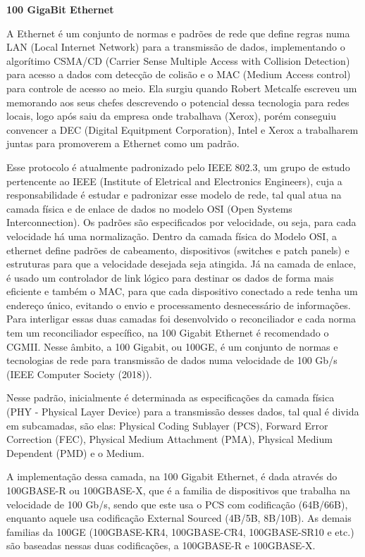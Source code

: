 \documentclass[a4paper,12pt]{article}
\begin{document}
\begin{center}
\textbf{{\LARGE 100 GigaBit Ethernet}} \\ \vspace{0.5cm}
\end{center}

A Ethernet é um conjunto de normas e padrões de rede que define regras numa LAN (Local Internet Network) para a transmissão de dados, implementando o algorítimo CSMA/CD (Carrier Sense Multiple Access with Collision Detection) para acesso a dados com detecção de colisão e o MAC (Medium Access control) para controle de acesso ao meio. Ela surgiu quando Robert Metcalfe escreveu um memorando aos seus chefes descrevendo o potencial dessa tecnologia para redes locais, logo após saiu da empresa onde trabalhava (Xerox), porém conseguiu convencer a DEC (Digital Equitpment Corporation), Intel e Xerox a trabalharem juntas para promoverem a Ethernet como um padrão.

Esse protocolo é atualmente padronizado pelo IEEE 802.3, um grupo de estudo pertencente ao IEEE (Institute of Eletrical and Electronics Engineers), cuja a responsabilidade é estudar e padronizar esse modelo de rede, tal qual atua na camada física e de enlace de dados no modelo OSI (Open Systems Interconnection). Os padrões são especificados por velocidade, ou seja, para cada velocidade há uma normalização.
Dentro da camada física do Modelo OSI, a ethernet define padrões de cabeamento, dispositivos (switches e patch panels) e estruturas para que a velocidade desejada seja atingida.
Já na camada de enlace, é usado um controlador de link lógico para destinar os dados de forma mais eficiente e também o MAC, para que cada dispositivo conectado a rede tenha um endereço único, evitando o envio e processamento desnecessário de informações.
Para interligar essas duas camadas foi desenvolvido o reconciliador e cada norma tem um reconciliador específico, na 100 Gigabit Ethernet é recomendado o CGMII.
Nesse âmbito, a 100 Gigabit, ou 100GE, é um conjunto de normas e tecnologias de rede para transmissão de dados numa velocidade de 100 Gb/s (IEEE Computer Society (2018)).


Nesse padrão, inicialmente é determinada as especificações da camada física (PHY - Physical Layer Device) para a transmissão desses dados, tal qual é divida em subcamadas, são elas: Physical Coding Sublayer (PCS), Forward Error Correction (FEC), Physical Medium Attachment (PMA), Physical Medium Dependent (PMD) e o Medium.

A implementação dessa camada, na 100 Gigabit Ethernet, é dada através do 100GBASE-R ou 100GBASE-X, que é a familia de dispositivos que trabalha na velocidade de 100 Gb/s, sendo que este usa o PCS com codificação (64B/66B), enquanto aquele usa codificação External Sourced (4B/5B, 8B/10B). As demais familias da 100GE (100GBASE-KR4, 100GBASE-CR4, 100GBASE-SR10 e etc.) são baseadas nessas duas codificações, a 100GBASE-R e 100GBASE-X.
\end{document}
